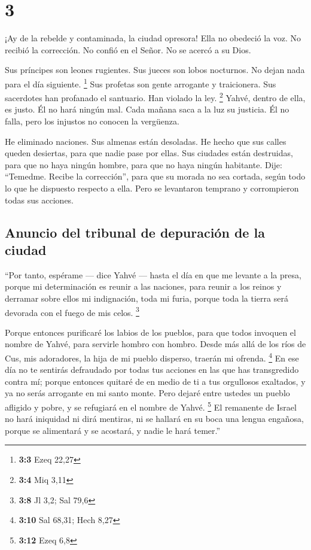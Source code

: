 \hypertarget{section-2}{%
\section{3}\label{section-2}}

 ¡Ay de la rebelde y contaminada, la ciudad opresora!
 Ella no obedeció la voz. No recibió la corrección. No
confió en el Señor. No se acercó a su Dios.

 Sus príncipes son leones rugientes. Sus jueces son lobos
nocturnos. No dejan nada para el día siguiente. \footnote{\textbf{3:3}
  Ezeq 22,27}  Sus profetas son gente arrogante y
traicionera. Sus sacerdotes han profanado el santuario. Han violado la
ley. \footnote{\textbf{3:4} Miq 3,11}  Yahvé, dentro de
ella, es justo. Él no hará ningún mal. Cada mañana saca a la luz su
justicia. Él no falla, pero los injustos no conocen la vergüenza.

 He eliminado naciones. Sus almenas están desoladas. He
hecho que sus calles queden desiertas, para que nadie pase por ellas.
Sus ciudades están destruidas, para que no haya ningún hombre, para que
no haya ningún habitante.  Dije: ``Temedme. Recibe la
corrección'', para que su morada no sea cortada, según todo lo que he
dispuesto respecto a ella. Pero se levantaron temprano y corrompieron
todas sus acciones.

\hypertarget{anuncio-del-tribunal-de-depuraciuxf3n-de-la-ciudad}{%
\subsection{Anuncio del tribunal de depuración de la
ciudad}\label{anuncio-del-tribunal-de-depuraciuxf3n-de-la-ciudad}}

 ``Por tanto, espérame --- dice Yahvé --- hasta el día en
que me levante a la presa, porque mi determinación es reunir a las
naciones, para reunir a los reinos y derramar sobre ellos mi
indignación, toda mi furia, porque toda la tierra será devorada con el
fuego de mis celos. \footnote{\textbf{3:8} Jl 3,2; Sal 79,6}

 Porque entonces purificaré los labios de los pueblos,
para que todos invoquen el nombre de Yahvé, para servirle hombro con
hombro.  Desde más allá de los ríos de Cus, mis
adoradores, la hija de mi pueblo disperso, traerán mi ofrenda.
\footnote{\textbf{3:10} Sal 68,31; Hech 8,27}  En ese día
no te sentirás defraudado por todas tus acciones en las que has
transgredido contra mí; porque entonces quitaré de en medio de ti a tus
orgullosos exaltados, y ya no serás arrogante en mi santo monte.
 Pero dejaré entre ustedes un pueblo afligido y pobre, y
se refugiará en el nombre de Yahvé. \footnote{\textbf{3:12} Ezeq 6,8}
 El remanente de Israel no hará iniquidad ni dirá
mentiras, ni se hallará en su boca una lengua engañosa, porque se
alimentará y se acostará, y nadie le hará temer.''


